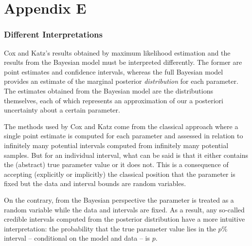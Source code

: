 \chapter*{Appendix E}\label{AppendixE}
\vspace{-1.75cm}
\subsection{Different Interpretations}

Cox and Katz's results obtained by maximum likelihood estimation 
and the results from the Bayesian model must be interpreted differently. The former are point estimates 
and confidence intervals, whereas the full Bayesian model provides an estimate of the marginal posterior 
{\it distribution} for each parameter. The estimates obtained from the Bayesian model are the 
distributions themselves, each of which represents an approximation of our a posteriori
uncertainty about a certain parameter. 

The methods used by Cox and Katz come from the classical approach where a single point 
estimate is computed for each parameter and assessed in relation to infinitely many potential 
intervals computed from infinitely many potential samples. %
But for an individual interval,
what can be said is that it either contains the (abstract) true parameter value or it does not. This is 
a consequence of accepting (explicitly or implicitly) the classical position that the parameter is fixed 
but the data and interval bounds are random variables. 

On the contrary, from the Bayesian perspective the parameter is treated as a random variable while 
the data and intervals are fixed. As a result, any so-called credible intervals computed from the 
posterior distribution have a more intuitive interpretation: the probability that the true parameter value lies 
in the $p\%$ interval  -- conditional on the model and data -- is $p$. 

